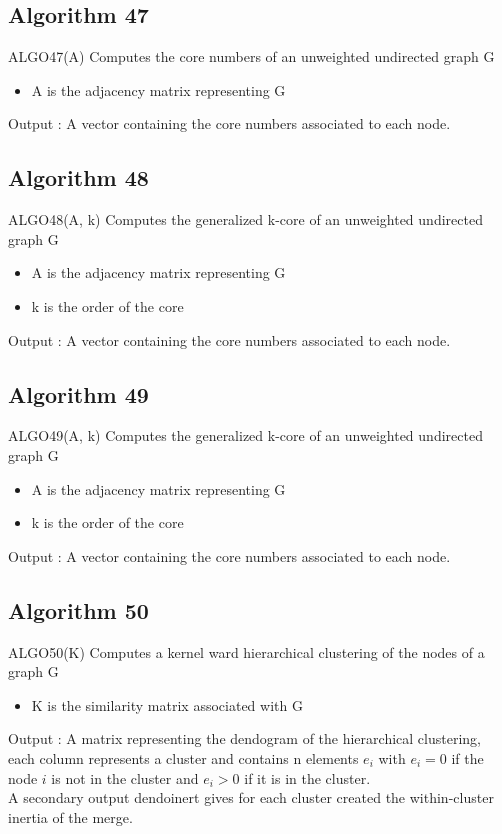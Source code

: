 \documentclass{eplDoc}
\begin{document}
\subsection{Algorithm 47}

ALGO47(A) Computes the core numbers of an unweighted undirected graph G 
\begin{itemize}
	\item A is the adjacency matrix representing G
\end{itemize}
 Output : A vector containing the core numbers associated to each node.



\subsection{Algorithm 48}
ALGO48(A, k) Computes the generalized k-core of an unweighted undirected graph G 
\begin{itemize}
	\item  A is the adjacency matrix representing G
   \item k is the order of the core
\end{itemize}
 Output : A vector containing the core numbers associated to each node. 


\subsection{Algorithm 49}
ALGO49(A, k) Computes the generalized k-core of an unweighted undirected graph G 
\begin{itemize}
	\item  A is the adjacency matrix representing G
   \item k is the order of the core
\end{itemize}
 Output : A vector containing the core numbers associated to each node. 


\subsection{Algorithm 50}

ALGO50(K) Computes a kernel ward hierarchical clustering of the nodes of a graph G
  
\begin{itemize}
	\item K is the similarity matrix associated with G
\end{itemize}
 Output : A matrix representing the dendogram of the hierarchical clustering, each 
 column represents a cluster and contains n elements $e_i$ with $e_i=0$ if the node $i$ is not in the cluster and 
 $e_i>0$ if it is in the cluster. \\ 
 A secondary output dendoinert gives for each cluster created the within-cluster inertia of the merge. 
\end{document}
